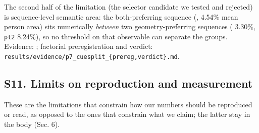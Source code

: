The second half of the limitation (the selector candidate we tested and rejected) is sequence-level semantic area: the both-preferring sequence (, 4.54\% mean person area) sits numerically \emph{between} two geometry-preferring sequences ( 3.30\%, \texttt{pt2} 8.24\%), so no threshold on that observable can separate the groups. Evidence: ; factorial preregistration and verdict: \texttt{results/evidence/p7\_cuesplit\_\{prereg,verdict\}.md}.




\subsection{S11. Limits on reproduction and measurement}


These are the limitations that constrain how our numbers should be reproduced or read, as opposed to the ones that constrain what we claim; the latter stay in the body (Sec. 6).


